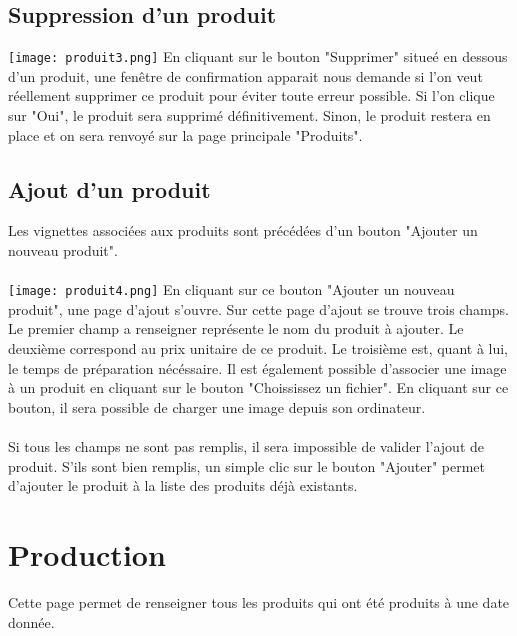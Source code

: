 \subsection{Suppression d'un produit}
\texttt{[image: produit3.png]}
En cliquant sur le bouton "Supprimer" situeé en dessous d'un produit, une 
fenêtre de confirmation apparait nous demande si l'on veut réellement supprimer 
ce produit pour éviter toute erreur possible. Si l'on clique sur "Oui", le 
produit sera supprimé définitivement. Sinon, le produit restera en place et on 
sera renvoyé sur la page principale "Produits".


\subsection{Ajout d'un produit}
Les vignettes associées aux produits sont précédées d'un bouton "Ajouter un 
nouveau produit".

\paragraph{}
\texttt{[image: produit4.png]}
En cliquant sur ce bouton "Ajouter un nouveau produit", une page d'ajout s'ouvre.
Sur cette page d'ajout se trouve trois champs. Le premier champ a renseigner 
représente le nom du produit à ajouter. Le deuxième correspond au prix unitaire 
de ce produit. Le troisième est, quant à lui, le temps de préparation nécéssaire.
Il est également possible d'associer une image à un produit en cliquant sur le 
bouton "Choississez un fichier". En cliquant sur ce bouton, il sera possible de 
charger une image depuis son ordinateur.

\paragraph{}
Si tous les champs ne sont pas remplis, il sera impossible de valider l'ajout de 
produit. S'ils sont bien remplis, un simple clic sur le bouton "Ajouter" 
permet d'ajouter le produit à la liste des produits déjà existants. 



\section{Production}
Cette page permet de renseigner tous les produits qui ont été produits à une date 
donnée.

